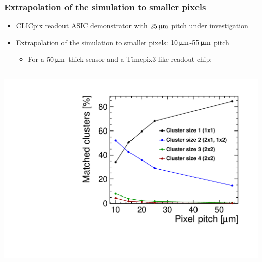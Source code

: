 \begin{frame}
  \frametitle{Extrapolation of the simulation to smaller pixels}



  \begin{itemize}
  \item CLICpix readout ASIC demonstrator with $25\,\upmu\mathrm{m}$ pitch
    under investigation
  \item Extrapolation of the simulation to smaller pixels:
    $10\,\upmu\mathrm{m}$-$55\,\upmu\mathrm{m}$ pitch
    \begin{itemize}
    \item For a $50\,\upmu\mathrm{m}$ thick sensor and a Timepix3-like readout
      chip:
    \end{itemize}
  \end{itemize}
    
  \begin{columns}
    \centering
    \includegraphics[width=\textwidth]{../figures/TestBeam/ClusterSize_extrapolationSmallerPixels.pdf}


\end{columns}
\end{frame}
